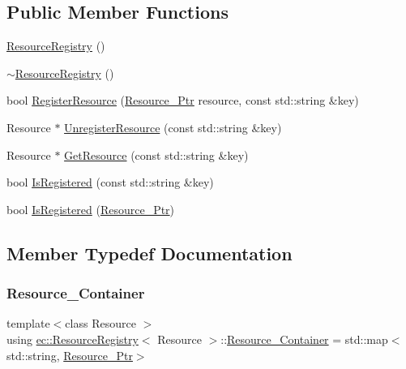 \subsection*{Public Member Functions}
\begin{DoxyCompactItemize}
\item 
\mbox{\hyperlink{classec_1_1_resource_registry_a9e0fdc82b578be6f0477f61116d5b361}{Resource\+Registry}} ()
\item 
\mbox{\hyperlink{classec_1_1_resource_registry_aa3153d0d76d45905833bafab53341731}{$\sim$\+Resource\+Registry}} ()
\item 
bool \mbox{\hyperlink{classec_1_1_resource_registry_acfe1e9c8129f0f5a9ac76cd2eb1ddd62}{Register\+Resource}} (\mbox{\hyperlink{classec_1_1_resource_registry_a77cf5381229bff47d251603c783115fe}{Resource\+\_\+\+Ptr}} resource, const std\+::string \&key)
\item 
Resource $\ast$ \mbox{\hyperlink{classec_1_1_resource_registry_a8abf828823a168161be907d1e867d993}{Unregister\+Resource}} (const std\+::string \&key)
\item 
Resource $\ast$ \mbox{\hyperlink{classec_1_1_resource_registry_a8893154d25333cbf0feeb14f06bede67}{Get\+Resource}} (const std\+::string \&key)
\item 
bool \mbox{\hyperlink{classec_1_1_resource_registry_a9a56b5a31fb90469eabb372bf3327188}{Is\+Registered}} (const std\+::string \&key)
\item 
bool \mbox{\hyperlink{classec_1_1_resource_registry_a4e1ce3971ba11bf0ebf3e447bb8a3ce7}{Is\+Registered}} (\mbox{\hyperlink{classec_1_1_resource_registry_a77cf5381229bff47d251603c783115fe}{Resource\+\_\+\+Ptr}})
\end{DoxyCompactItemize}


\subsection{Member Typedef Documentation}
\mbox{\label{classec_1_1_resource_registry_a0a2b5090a2bbc638a04a2c283812b956}} 
\subsubsection{\texorpdfstring{Resource\+\_\+\+Container}{Resource\_Container}}
{\footnotesize\ttfamily template$<$class Resource $>$ \\
using \mbox{\hyperlink{classec_1_1_resource_registry}{ec\+::\+Resource\+Registry}}$<$ Resource $>$\+::\mbox{\hyperlink{classec_1_1_resource_registry_a0a2b5090a2bbc638a04a2c283812b956}{Resource\+\_\+\+Container}} =  std\+::map$<$std\+::string, \mbox{\hyperlink{classec_1_1_resource_registry_a77cf5381229bff47d251603c783115fe}{Resource\+\_\+\+Ptr}}$>$}

